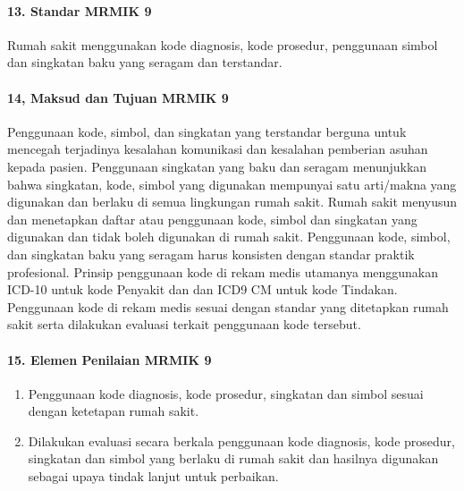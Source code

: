 \documentclass[
]{book}
\providecommand{\tightlist}{%
  \setlength{\itemsep}{0pt}\setlength{\parskip}{0pt}}
\begin{document}
\hypertarget{standar-mrmik-9}{%
\paragraph*{13. Standar MRMIK 9}\label{standar-mrmik-9}}

Rumah sakit menggunakan kode diagnosis, kode prosedur, penggunaan simbol dan singkatan baku yang seragam dan terstandar.

\hypertarget{maksud-dan-tujuan-mrmik-9}{%
\paragraph*{14, Maksud dan Tujuan MRMIK 9}\label{maksud-dan-tujuan-mrmik-9}}

Penggunaan kode, simbol, dan singkatan yang terstandar berguna untuk mencegah terjadinya kesalahan komunikasi dan kesalahan pemberian asuhan kepada pasien. Penggunaan singkatan yang baku dan seragam menunjukkan bahwa singkatan, kode, simbol yang digunakan mempunyai satu arti/makna yang digunakan dan berlaku di semua lingkungan rumah sakit.
Rumah sakit menyusun dan menetapkan daftar atau penggunaan kode, simbol dan singkatan yang digunakan dan tidak boleh digunakan di rumah sakit. Penggunaan kode, simbol, dan singkatan baku yang seragam harus konsisten dengan standar praktik profesional. Prinsip penggunaan kode di rekam medis utamanya menggunakan ICD-10 untuk kode Penyakit dan dan ICD9 CM untuk kode Tindakan. Penggunaan kode di rekam medis sesuai dengan standar yang ditetapkan rumah sakit serta dilakukan evaluasi terkait penggunaan kode tersebut.

\hypertarget{elemen-penilaian-mrmik-9}{%
\paragraph*{15. Elemen Penilaian MRMIK 9}\label{elemen-penilaian-mrmik-9}}

\begin{enumerate}
\def\labelenumi{\alph{enumi}.}
\tightlist
\item
  Penggunaan kode diagnosis, kode prosedur, singkatan dan simbol sesuai dengan ketetapan rumah sakit.
\item
  Dilakukan evaluasi secara berkala penggunaan kode diagnosis, kode prosedur, singkatan dan simbol yang berlaku di rumah sakit dan hasilnya digunakan sebagai upaya tindak lanjut untuk perbaikan.
\end{enumerate}
\end{document}
